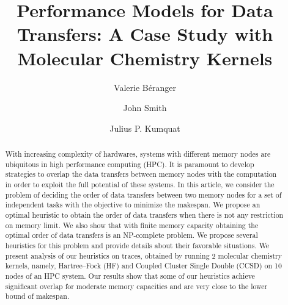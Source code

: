 \documentclass[sigconf]{acmart}
\begin{document}
\title{Performance Models for Data Transfers: A Case Study with Molecular Chemistry Kernels}

\author{Valerie B\'eranger}
\author{John Smith}

\author{Julius P. Kumquat}

\renewcommand{\shortauthors}{Trovato and Tobin, et al.}

%
\begin{abstract}
With increasing complexity of hardwares, systems with different memory nodes are ubiquitous in high performance computing (HPC). It is paramount to develop strategies to overlap the data transfers between memory nodes with the computation in order to exploit the full potential of these systems. In this article, we consider the problem of deciding the  order of data transfers between two memory nodes for a set of independent tasks  with the objective to minimize the makespan. We propose an optimal heuristic to obtain the order of data transfers when there is not any restriction on memory limit. We also show that with finite memory capacity obtaining the optimal order of data transfers is an NP-complete problem. We propose several heuristics for this problem and provide details about their favorable situations. We present analysis of our heuristics on traces, obtained by running 2 molecular chemistry kernels, namely, Hartree–Fock (HF)  and Coupled Cluster Single Double (CCSD) on 10 nodes of an HPC system. Our results show that some of our heuristics achieve significant overlap for moderate memory capacities and are very close to the lower bound of makespan.
\end{abstract}

\end{document}
